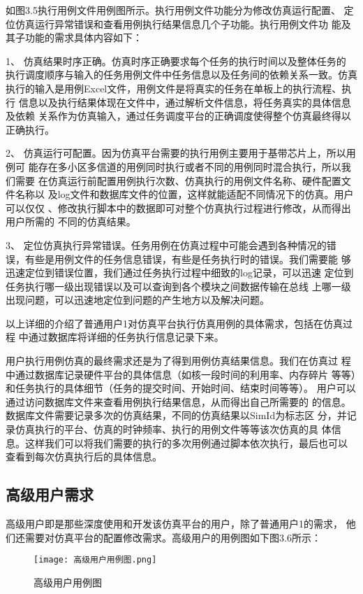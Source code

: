 如图3.5执行用例文件用例图所示。执行用例文件功能分为修改仿真运行配置、
定位仿真运行异常错误和查看用例执行结果信息几个子功能。执行用例文件功
能及其子功能的需求具体内容如下：

1、	仿真结果时序正确。仿真时序正确要求每个任务的执行时间以及整体任务的
执行调度顺序与输入的任务用例文件中任务信息以及任务间的依赖关系一致。仿真
执行的输入是用例Excel文件，用例文件是将真实的任务在单板上的执行流程、执行
信息以及执行结果体现在文件中，通过解析文件信息，将任务真实的具体信息及依赖
关系作为仿真输入，通过任务调度平台的正确调度使得整个仿真最终得以正确执行。

2、	仿真运行可配置。因为仿真平台需要的执行用例主要用于基带芯片上，所以用例可
能存在多小区多信道的用例同时执行或者不同的用例同时混合执行，所以我们需要
在仿真运行前配置用例执行次数、仿真执行的用例文件名称、硬件配置文件名称以
及log文件和数据库文件的位置，这样就能适配不同情况下的仿真。用户可以仅仅
、修改执行脚本中的数据即可对整个仿真执行过程进行修改，从而得出用户所需的
不同的仿真结果。

3、	定位仿真执行异常错误。任务用例在仿真过程中可能会遇到各种情况的错
误，有些是用例文件的任务信息错误，有些是任务执行时的错误。我们需要能
够迅速定位到错误位置，我们通过任务执行过程中细致的log记录，可以迅速
定位到任务执行哪一级出现错误以及可以查询到各个模块之间数据传输在总线
上哪一级出现问题，可以迅速地定位到问题的产生地方以及解决问题。

以上详细的介绍了普通用户1对仿真平台执行仿真用例的具体需求，包括在仿真过程
中通过数据库将详细的任务执行信息记录下来。

用户执行用例仿真的最终需求还是为了得到用例仿真结果信息。我们在仿真过
程中通过数据库记录硬件平台的具体信息（如核一段时间的利用率、内存碎片
等等）和任务执行的具体细节（任务的提交时间、开始时间、结束时间等等）。
用户可以通过访问数据库文件来查看用例执行结果信息，从而得出自己所需要的
的信息。数据库文件需要记录多次的仿真结果，不同的仿真结果以SimId为标志区
分，并记录仿真执行的平台、仿真的时钟频率、执行的用例文件等等该次仿真的具
体信息。这样我们可以将我们需要的执行的多次用例通过脚本依次执行，最后也可以
查看到每次仿真执行后的具体信息。

\subsection{高级用户需求}
高级用户即是那些深度使用和开发该仿真平台的用户，除了普通用户1的需求，
他们还需要对仿真平台的配置修改需求。高级用户的用例图如下图3.6所示：

\begin{figure}[h]
    \centering
    \texttt{[image: 高级用户用例图.png]}
    \caption{高级用户用例图}
    \label{fig:badge}
\end{figure}

